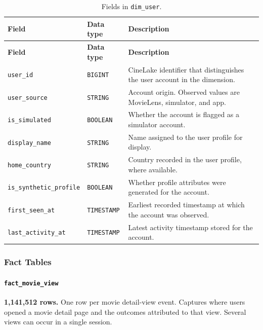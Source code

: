 \documentclass[a4paper,12pt]{article}
\newcommand{\dbsep}{\_\allowbreak}
\begin{document}
\begingroup
\small
\setlength{\tabcolsep}{4pt}
\renewcommand{\arraystretch}{1.1}
\begin{longtable}{@{}>{\raggedright\arraybackslash}p{}
                    >{\raggedright\arraybackslash}p{}
                    >{\raggedright\arraybackslash}p{}@{}}
\caption{Fields in \texttt{dim\dbsep user}.}\\
\toprule
\textbf{Field} & \textbf{Data type} & \textbf{Description}\\
\midrule
\endfirsthead
\toprule
\textbf{Field} & \textbf{Data type} & \textbf{Description}\\
\midrule
\endhead
\bottomrule
\endfoot
\texttt{user\dbsep id} & \texttt{BIGINT} & CineLake identifier that distinguishes the user account in the dimension.\\
\texttt{user\dbsep source} & \texttt{STRING} & Account origin. Observed values are MovieLens, simulator, and app.\\
\texttt{is\dbsep simulated} & \texttt{BOOLEAN} & Whether the account is flagged as a simulator account.\\
\texttt{display\dbsep name} & \texttt{STRING} & Name assigned to the user profile for display.\\
\texttt{home\dbsep country} & \texttt{STRING} & Country recorded in the user profile, where available.\\
\texttt{is\dbsep synthetic\dbsep profile} & \texttt{BOOLEAN} & Whether profile attributes were generated for the account.\\
\texttt{first\dbsep seen\dbsep at} & \texttt{TIMESTAMP} & Earliest recorded timestamp at which the account was observed.\\
\texttt{last\dbsep activity\dbsep at} & \texttt{TIMESTAMP} & Latest activity timestamp stored for the account.\\
\end{longtable}
\endgroup

\subsubsection{Fact Tables}

\paragraph{\texttt{fact\dbsep movie\dbsep view}}
\textbf{1,141,512 rows.} One row per movie detail-view event.
Captures where users opened a movie detail page and the outcomes attributed to that view. Several views can occur in a single session.
\end{document}
